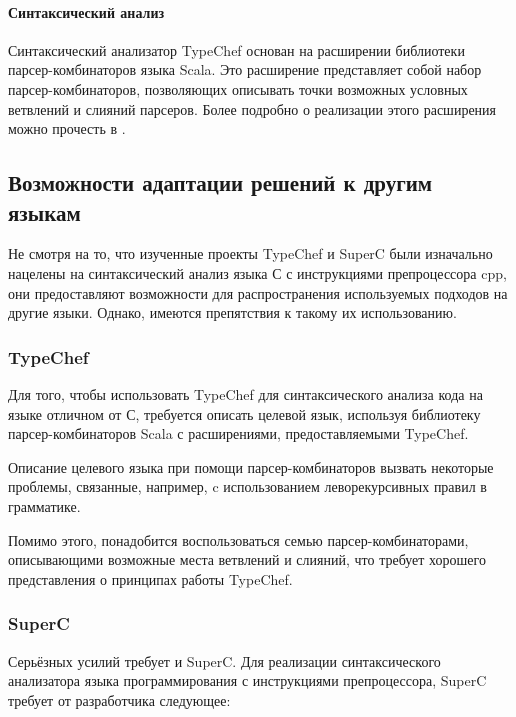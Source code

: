 \paragraph{Синтаксический анализ}

Синтаксический анализатор TypeChef основан на расширении библиотеки парсер-комбинаторов языка Scala. Это расширение представляет собой набор парсер-комбинаторов, позволяющих описывать точки возможных условных ветвлений и слияний парсеров. Более подробно о реализации этого расширения можно прочесть в \cite{typechef2}.


\subsection{Возможности адаптации решений к другим языкам}
\label{subsec:solutionsadaptation}

Не смотря на то, что изученные проекты TypeChef и SuperC были изначально нацелены на синтаксический анализ языка С с инструкциями препроцессора cpp, они предоставляют возможности для распространения используемых подходов на другие языки. Однако, имеются препятствия к такому их использованию.

\subsubsection{TypeChef}

Для того, чтобы использовать TypeChef для синтаксического анализа кода на языке отличном от С, требуется описать целевой язык, используя библиотеку парсер-комбинаторов Scala с расширениями, предоставляемыми TypeChef.

Описание целевого языка при помощи парсер-комбинаторов вызвать некоторые проблемы, связанные, например, c использованием леворекурсивных правил в грамматике. 

Помимо этого, понадобится воспользоваться семью парсер-комбинаторами, описывающими возможные места ветвлений и слияний, что требует хорошего представления о принципах работы TypeChef.

\subsubsection{SuperC}

Серьёзных усилий требует и SuperC. Для реализации синтаксического анализатора языка программирования с инструкциями препроцессора, SuperC требует от разработчика следующее:


